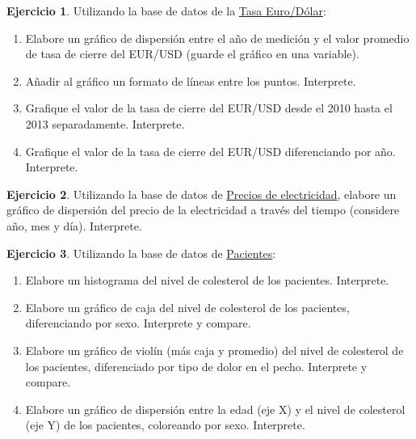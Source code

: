 \documentclass[
  11pt,
]{book}
\providecommand{\tightlist}{%
  \setlength{\itemsep}{0pt}\setlength{\parskip}{0pt}}
\theoremstyle{definition}
\theoremstyle{definition}
\theoremstyle{definition}
\newtheorem{exercise}{Ejercicio}[chapter]
\theoremstyle{definition}
\theoremstyle{remark}
\begin{document}
\begin{exercise}

Utilizando la base de datos de la \hyperref[TasaEURUSD]{Tasa Euro/Dólar}:

\begin{enumerate}
\def\labelenumi{\arabic{enumi}.}
\tightlist
\item
  Elabore un gráfico de dispersión entre el año de medición y el valor promedio de tasa de cierre del EUR/USD (guarde el gráfico en una variable).
\item
  Añadir al gráfico un formato de líneas entre los puntos. Interprete.
\item
  Grafique el valor de la tasa de cierre del EUR/USD desde el 2010 hasta el 2013 separadamente. Interprete.
\item
  Grafique el valor de la tasa de cierre del EUR/USD diferenciando por año. Interprete.
\end{enumerate}

\end{exercise}

\begin{exercise}
Utilizando la base de datos de \hyperref[PreciosElectricidad]{Precios de electricidad}, elabore un gráfico de dispersión del precio de la electricidad a través del tiempo (considere año, mes y día). Interprete.
\end{exercise}

\begin{exercise}

Utilizando la base de datos de \hyperref[Pacientes]{Pacientes}:

\begin{enumerate}
\def\labelenumi{\arabic{enumi}.}
\tightlist
\item
  Elabore un histograma del nivel de colesterol de los pacientes. Interprete.
\item
  Elabore un gráfico de caja del nivel de colesterol de los pacientes, diferenciando por sexo. Interprete y compare.
\item
  Elabore un gráfico de violín (más caja y promedio) del nivel de colesterol de los pacientes, diferenciado por tipo de dolor en el pecho. Interprete y compare.
\item
  Elabore un gráfico de dispersión entre la edad (eje X) y el nivel de colesterol (eje Y) de los pacientes, coloreando por sexo. Interprete.
\end{enumerate}

\end{exercise}
\end{document}
